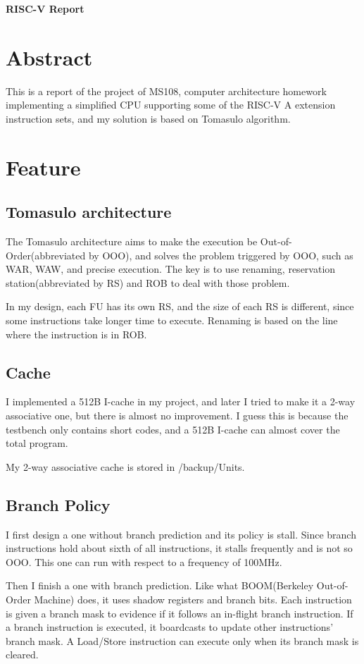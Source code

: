 \documentclass[12pt,letterpaper]{article}
\begin{document}
\textbf{\Large RISC-V Report}
\section{Abstract}
    This is a report of the project of MS108, computer architecture homework implementing a simplified CPU supporting some of the RISC-V 
    A extension instruction sets, and my solution is based on Tomasulo algorithm. 
\section{Feature}
\subsection{Tomasulo architecture}
    The Tomasulo architecture aims to make the execution be Out-of-Order(abbreviated by OOO), 
    and solves the problem triggered by OOO, such as WAR, WAW, and precise execution. The key is to use renaming, 
    reservation station(abbreviated by RS) and ROB to deal with those problem. 

    In my design, each FU has its own RS, and the size of each RS is different, since some instructions 
    take longer time to execute. Renaming is based on the line where the instruction is in ROB. 
\subsection{Cache}
    I implemented a 512B I-cache in my project, and later I tried to make it a 2-way associative one, but there is almost no improvement. 
    I guess this is because the testbench only contains short codes, and a 512B I-cache can almost cover the total program. 

    My 2-way associative cache is stored in /backup/Units. 
\subsection{Branch Policy}
    I first design a one without branch prediction and its policy is stall. Since branch instructions hold about sixth of all instructions, 
    it stalls frequently and is not so OOO. This one can run with respect to a frequency of 100MHz. 

    Then I finish a one with branch prediction. Like what BOOM(Berkeley Out-of-Order Machine) does, it uses shadow registers and branch bits. 
    Each instruction is given a branch mask to evidence if it follows an in-flight branch instruction. If a branch instruction is executed, 
    it boardcasts to update other instructions' branch mask. A Load/Store instruction can execute only when its branch mask is cleared. 
\end{document}
